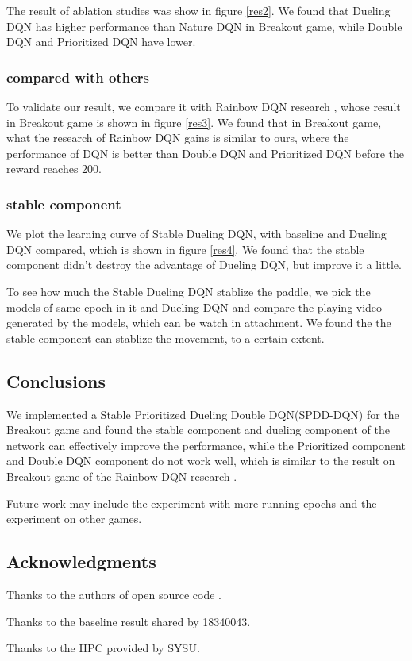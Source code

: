 \documentclass[a4paper, 11pt]{article}
\begin{document}
The result of ablation studies was show in figure \ref{res2}. We found that Dueling DQN has higher performance than Nature DQN in Breakout game, while Double DQN and Prioritized DQN have lower.
\subsubsection{compared with others}
To validate our result, we compare it with Rainbow DQN research \cite{ref7}, whose result in Breakout game is shown in figure \ref{res3}. We found that in Breakout game, what the research of Rainbow DQN gains is similar to ours, where the performance of DQN is better than Double DQN and Prioritized DQN before the reward reaches 200.
\subsubsection{stable component}
We plot the learning curve of Stable Dueling DQN, with baseline and Dueling DQN compared, which is shown in figure \ref{res4}. We found that the stable component didn't destroy the advantage of Dueling DQN, but improve it a little.

To see how much the Stable Dueling DQN stablize the paddle, we pick the models of same epoch in it and Dueling DQN and compare the playing video generated by the models, which can be watch in attachment. We found the the stable component can stablize the movement, to a certain extent.
\subsection{Conclusions}
We implemented a Stable Prioritized Dueling Double DQN(SPDD-DQN) for the Breakout game and found the stable component and dueling component of the network can effectively improve the performance, while the Prioritized component and Double DQN component do not work well, which is similar to the result on Breakout game of the Rainbow DQN research \cite{ref7}.

Future work may include the experiment with more running epochs and the experiment on other games.
\subsection{Acknowledgments}
Thanks to the authors of open source code \cite{ref5}.

Thanks to the baseline result shared by 18340043.

Thanks to the HPC provided by SYSU.
\end{document}
